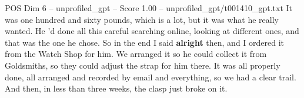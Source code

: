 \begin{textsample}{POS Dim 6 – unprofiled\_gpt – Score 1.00 – unprofiled\_gpt/t001410\_gpt.txt}  \label{ex:f6_pos_026}
It was one hundred and sixty pounds, which is a lot, but it was what he really wanted.
He ’d done all this careful searching online, looking at different ones, and that was the one he chose.
So in the end I said \textbf{alright} then, and I ordered it from the Watch Shop for him.
We arranged it so he could collect it from Goldsmiths, so they could adjust the strap for him there.
It was all properly done, all arranged and recorded by email and everything, so we had a clear trail.
And then, in less than three weeks, the clasp just broke on it.

\end{textsample}
